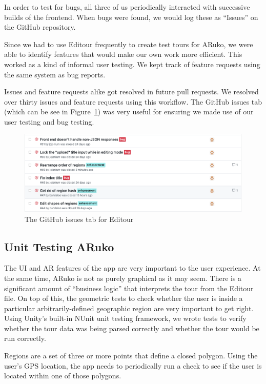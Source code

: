 \documentclass[a4paper, 10pt, american, titlepage]{article}
\begin{document}
In order to test for bugs, all three of us periodically interacted with
successive builds of the frontend. When bugs were found, we would log these as
``Issues'' on the GitHub repository.

Since we had to use Editour frequently to create test tours for ARuko, we were
able to identify features that would make our own work more efficient. This
worked as a kind of informal user testing. We kept track of feature requests
using the same system as bug reports.

Issues and feature requests alike got resolved in future pull requests. We
resolved over thirty issues and feature requests using this workflow. The GitHub
issues tab (which can be see in Figure~\ref{fig:issuesPageExample}) was very
useful for ensuring we made use of our user testing and bug testing.

\begin{figure}[h]
	\centering
	\includegraphics[width=\textwidth]{issues-page-example.png}
	\caption{The GitHub issues tab for Editour}
	\label{fig:issuesPageExample}
\end{figure}

\subsection{Unit Testing ARuko}
\label{sec:unitTestingARuko}

The UI and AR features of the app are very important to the user experience. At
the same time, ARuko is not as purely graphical as it may seem. There is a
significant amount of ``business logic'' that interprets the tour from the
Editour file. On top of this, the geometric tests to check whether the user is
inside a particular arbitrarily-defined geographic region are very important to
get right.  Using Unity's built-in NUnit unit testing framework, we wrote tests
to verify whether the tour data was being parsed correctly and whether the tour
would be run correctly.

Regions are a set of three or more points that define a closed polygon. Using
the user's GPS location, the app needs to periodically run a check to see if the
user is located within one of those polygons.
\end{document}
